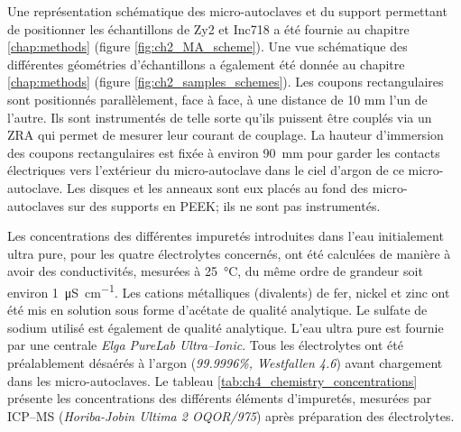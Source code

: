 \begin{refsection}
    Une représentation schématique des micro-autoclaves et du support permettant de positionner 
    les échantillons de Zy2 et Inc718 a été fournie au chapitre \ref{chap:methods} (figure \ref{fig:ch2_MA_scheme}). 
    Une vue schématique des différentes géométries d’échantillons a également été donnée 
    au chapitre \ref{chap:methods} (figure \ref{fig:ch2_samples_schemes}). 
    Les coupons rectangulaires sont positionnés parallèlement, face à face, à une distance de 10 mm l’un de l’autre.
    Ils sont instrumentés de telle sorte qu’ils puissent être couplés via un ZRA qui permet de mesurer leur courant de couplage.
    La hauteur d’immersion des coupons rectangulaires est fixée à environ \SI{90}{\milli\meter} pour garder les contacts électriques vers
    l’extérieur du micro-autoclave dans le ciel d’argon de ce micro-autoclave. 
    Les disques et les anneaux sont eux placés au fond des micro-autoclaves sur des supports en PEEK; ils ne sont pas instrumentés.

    Les concentrations des différentes impuretés introduites dans l’eau initialement ultra pure, pour les quatre
    électrolytes concernés, ont été calculées de manière à avoir des conductivités, mesurées à \SI{25}{\degreeCelsius}, du même ordre
    de grandeur soit environ \SI{1}{\micro\siemens\per\centi\meter}. Les cations métalliques (divalents) de fer, nickel et zinc ont été mis
    en solution sous forme d’acétate de qualité analytique. Le sulfate de sodium utilisé est également de qualité analytique. 
    L’eau ultra pure est fournie par une centrale \emph{Elga PureLab Ultra--Ionic}. Tous les électrolytes ont été préalablement désaérés
    à l’argon (\emph{99.9996\%, Westfallen 4.6}) avant chargement dans les micro-autoclaves. 
    Le tableau \ref{tab:ch4_chemistry_concentrations} présente les concentrations des différents éléments d’impuretés, mesurées par 
    ICP--MS (\emph{Horiba-Jobin Ultima 2 OQOR/975}) après préparation des électrolytes.


\end{refsection}
